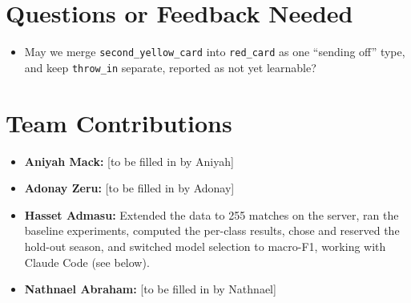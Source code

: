 \documentclass[11pt]{article}
\begin{document}
\section*{Questions or Feedback Needed}
\begin{itemize}[noitemsep]
  \item May we merge \texttt{second\_yellow\_card} into \texttt{red\_card} as one ``sending off'' type, and keep
        \texttt{throw\_in} separate, reported as not yet learnable?
\end{itemize}

\section*{Team Contributions}
\begin{itemize}[noitemsep]
  \item \textbf{Aniyah Mack:} [to be filled in by Aniyah]
  \item \textbf{Adonay Zeru:} [to be filled in by Adonay]
  \item \textbf{Hasset Admasu:} Extended the data to 255 matches on the server, ran the baseline experiments,
        computed the per-class results, chose and reserved the hold-out season, and
        switched model selection to macro-F1, working with Claude Code (see below).
  \item \textbf{Nathnael Abraham:} [to be filled in by Nathnael]
\end{itemize}
\end{document}
